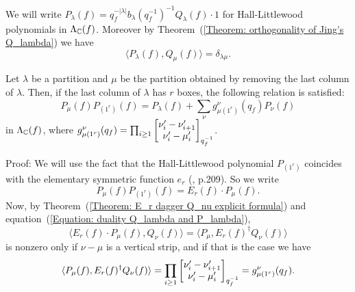 \begin{dang}
    \begin{notation}
        We will write $P_\lambda(f) = q_f^{-|\lambda|}b_\lambda(q_f^{-1})^{-1}Q_\lambda(f)\cdot1$ for Hall-Littlewood polynomials in $\Lambda_{\mathbb{C}}(f)$. Moreover by Theorem~(\ref{Theorem: orthogonality of Jing's Q_lambda}) we have 
        \begin{equation}\label{Equation: duality Q_lambda and P_lambda}
            \langle P_\lambda(f), Q_\mu(f) \rangle = \delta_{\lambda\mu}.
        \end{equation}
    \end{notation}
\end{dang}
\begin{dang}
\begin{theorem}\cite{jing1991vertex}\label{Theorem: product between hall littlewood polynomials P_mu and P_(1pr)}
Let $\lambda$ be a partition and $\mu$ be the partition obtained by removing the last column of $\lambda$. Then, if the last column of $\lambda$ has $r$ boxes, the following relation is satisfied:
    \begin{equation}\label{Equation: product between hall littlewood polynomials P_mu and P_(1pr)}
        P_\mu(f) P_{(1^r)}(f) = P_\lambda(f) +\sum_{\nu}g_{\mu(1^r)}^\nu(q_f) P_\nu(f)
    \end{equation}
    in $\Lambda_{\mathbb{C}}(f)$, where $g_{\mu(1^r)}^\nu(q_f)=\prod_{i\geq1}\begin{bmatrix} \nu_i^\prime-\nu_{i+1}^\prime\\\nu_i^\prime-\mu_i^\prime\end{bmatrix}_{q_f^{-1}}$.
\end{theorem}
\end{dang}
Proof: We will use the fact that the Hall-Littlewood polynomial $P_{(1^r)}$ coincides with the elementary symmetric function $e_r$ (\cite{macdonald1998symmetric}, p.209). So we write
\begin{equation}
  P_\mu(f) P_{(1^r)}(f)=E_r(f)\cdot P_\mu(f).
\end{equation}
Now, by Theorem~(\ref{Theorem: E_r dagger Q_nu explicit formula}) and equation~(\ref{Equation: duality Q_lambda and P_lambda}),
\begin{equation}
    \langle E_r(f)\cdot P_\mu(f), Q_\nu(f)\rangle=\langle P_\mu,E_r(f)^\dagger Q_\nu(f)\rangle
\end{equation}
is nonzero only if $\nu-\mu$ is a vertical strip, and if that is the case we have
\begin{equation}\label{Equation: support of P_mu P_(1pr)}
    \langle P_\mu(f),E_r(f)^\dagger Q_\nu(f)\rangle=\prod_{i\geq1}\begin{bmatrix} \nu_i^\prime-\nu_{i+1}^\prime\\\nu_i^\prime-\mu_i^\prime\end{bmatrix}_{q_f^{-1}}=g_{\mu(1^r)}^\nu(q_f).
\end{equation}

